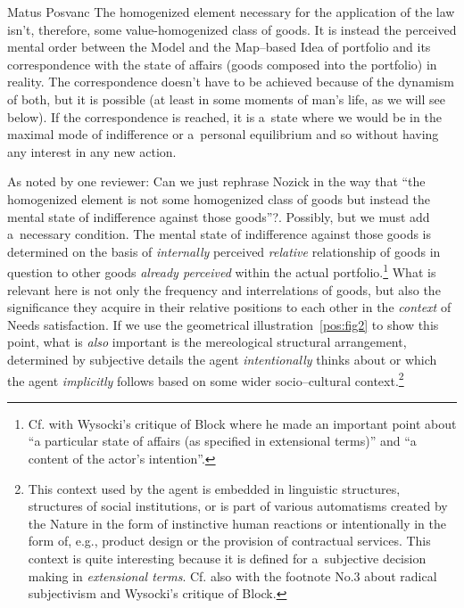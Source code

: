 \begin{artengenv}{Matus Posvanc}
The homogenized element necessary for the application of the law isn't, therefore, some value-homogenized class of goods. It is instead the perceived mental order between the Model and the Map–based Idea of portfolio and its correspondence with the state of affairs (goods composed into the portfolio) in reality. The correspondence doesn't have to be achieved because of the dynamism of both, but it is possible (at least in some moments of man's life, as we will see below). If the correspondence is reached, it is a~state where we would be in the maximal mode of indifference or a~personal equilibrium and so without having any interest in any new action.



As noted by one reviewer: Can we just rephrase Nozick in the way that ``the homogenized element is not some homogenized class of goods but instead the mental state of indifference against those goods''?. Possibly, but we must add a~necessary condition. The mental state of indifference against those goods is determined on the basis of \textit{internally} perceived \textit{relative} relationship of goods in question to other goods \textit{already perceived} within the actual portfolio.\footnote{Cf. with Wysocki's 
\parencite*[][pp.26–27]{Wysocki2021problem} %
 critique of Block where he made an important point about ``a particular state of affairs (as specified in extensional terms)'' and ``a content of the actor's intention''.} What is relevant here is not only the frequency and interrelations of goods, but also the significance they acquire in their relative positions to each other in the \textit{context} of Needs satisfaction. If we use the geometrical illustration~\ref{pos:fig2} to show this point, what is \textit{also} important is the mereological structural arrangement, determined by subjective details the agent \textit{intentionally} thinks about or which the agent \textit{implicitly} follows based on some wider socio–cultural context.\footnote{This context used by the agent is embedded in linguistic structures, structures of social institutions, or is part of various automatisms created by the Nature in the form of instinctive human reactions or intentionally in the form of, e.g., product design or the provision of contractual services. This context is quite interesting because it is defined for a~subjective decision making in \textit{extensional terms}. Cf. also with the footnote No.3 about radical subjectivism and Wysocki's 
\parencite*[][pp.26–27]{Wysocki2021problem} %
 critique of Block.}




\end{artengenv}
